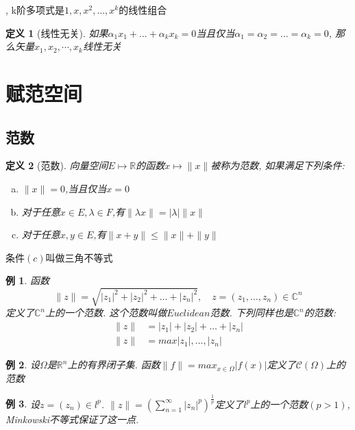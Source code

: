 \documentclass[a4paper,11pt]{book}
\newtheorem{definition}{\hspace{2em}定义}[section]
\newtheorem{example}{例}[section]
\begin{document}
, k阶多项式是$1,x,x^2,\dots,x^k$的线性组合

\begin{definition}[线性无关]
  如果$\alpha_1x_1+\dots+\alpha_kx_k=0$当且仅当$\alpha_1=\alpha_2=\dots=\alpha_k=0$, 那么矢量${x_1,x_2,\cdots,x_k}$线性无关
\end{definition}
\section{赋范空间}
\subsection*{范数}
\begin{definition}[范数]
  向量空间$E\mapsto\mathbb{R}$的函数$x\mapsto\|x\|$被称为范数, 如果满足下列条件:
  \begin{enumerate}[(a)]
    \item $\|x\|=0$,当且仅当$x=0$
    \item 对于任意$x\in E,\lambda\in F$,有$\|\lambda x\|=|\lambda|\|x\|$
    \item 对于任意$x,y\in E$,有$\|x+y\|\leq\|x\|+\|y\|$
  \end{enumerate}
\end{definition}
条件$(c)$叫做三角不等式
\begin{example}
  函数
  \begin{equation*}
    \|z\|=\sqrt{|z_1|^2+|z_2|^2+\dots+|z_n|^2},\quad z=(z_1,\dots,z_n)\in\mathbb{C}^n
  \end{equation*}
  定义了$\mathbb{C}^n$上的一个范数. 这个范数叫做$Euclidean$范数. 下列同样也是$\mathbb{C}^n$的范数:
  \begin{equation*}
    \begin{split}
       \|z\| & =|z_1|+|z_2|+\dots+|z_n| \\
       \|z\| & =max{|z_1|,\dots,|z_n|}
    \end{split}
  \end{equation*}
\end{example}
\begin{example}\label{norm1}
  设$\Omega$是$\mathbb{R}^n$上的有界闭子集. 函数$\|f\|=max_{x\in\Omega}|f(x)|$定义了$\mathcal{C}(\Omega)$上的范数
\end{example}
\begin{example}\label{norm2}
  设$z=(z_n)\in l^p$. $\|z\|=(\sum_{n=1}^{\infty}|z_n|^p)^\frac{1}{p}$定义了$l^p$上的一个范数$(p>1)$, Minkowski不等式保证了这一点.
\end{example}
\end{document}
